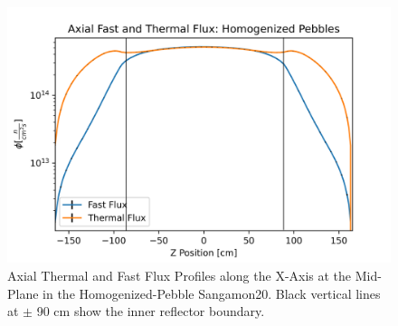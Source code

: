 \begin{figure}[H]
\centering

\includegraphics[width=0.75\linewidth]{figures/fast_therm_flux_homog_z_er.png}

\caption{Axial Thermal and Fast Flux Profiles along the X-Axis at the Mid-Plane in the Homogenized-Pebble Sangamon20.  Black vertical lines at $\pm$ 90 cm show the inner reflector boundary.}
\label{fig:hom-det-z}
\end{figure}